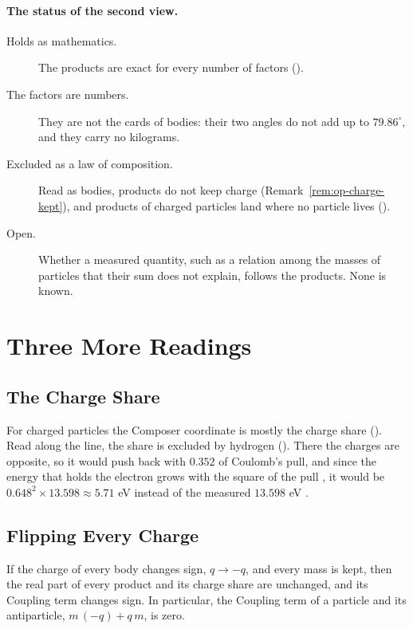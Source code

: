 \paragraph{The status of the second view.}
\begin{description}
  \item[Holds as mathematics.] The products are exact for every number of factors ().
  \item[The factors are numbers.] They are not the cards of bodies: their two angles do not add up to $79.86^\circ$, and they carry no kilograms.
  \item[Excluded as a law of composition.] Read as bodies, products do not keep charge (Remark~\ref{rem:op-charge-kept}), and products of charged particles land where no particle lives ().
  \item[Open.] Whether a measured quantity, such as a relation among the masses of particles that their sum does not explain, follows the products. None is known.
\end{description}

\section{Three More Readings}\label{sec:op-more}

\subsection{The Charge Share}\label{subsec:op-share}

For charged particles the Composer coordinate is mostly the charge share (). Read along the line, the share is excluded by hydrogen (). There the charges are opposite, so it would push back with $0.352$ of Coulomb's pull, and since the energy that holds the electron grows with the square of the pull \citep{Bohr1913}, it would be $0.648^2 \times 13.598 \approx 5.71$ eV instead of the measured $13.598$ eV \citep{Sansonetti2005}.

\subsection{Flipping Every Charge}\label{subsec:op-flip}

\begin{proposition}\label{prop:op-flip}
If the charge of every body changes sign, $q \to -q$, and every mass is kept, then the real part of every product and its charge share are unchanged, and its Coupling term changes sign. In particular, the Coupling term of a particle and its antiparticle, $m\,(-q) + q\,m$, is zero.
\end{proposition}

